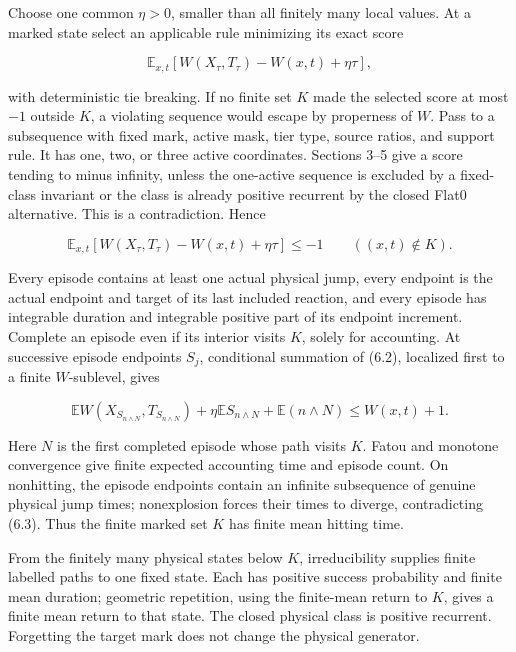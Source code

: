 Choose one common \(\eta>0\), smaller than all finitely many local
values. At a marked state select an applicable rule minimizing its exact
score

\[
       \mathbb E_{x,t}[W(X_\tau,T_\tau)-W(x,t)+\eta\tau], \tag{6.1}
\]

with deterministic tie breaking. If no finite set \(K\) made the
selected score at most \(-1\) outside \(K\), a violating sequence would
escape by properness of \(W\). Pass to a subsequence with fixed mark,
active mask, tier type, source ratios, and support rule. It has one,
two, or three active coordinates. Sections 3--5 give a score tending to
minus infinity, unless the one-active sequence is excluded by a
fixed-class invariant or the class is already positive recurrent by the
closed Flat0 alternative. This is a contradiction. Hence

\[
 \mathbb E_{x,t}[W(X_\tau,T_\tau)-W(x,t)+\eta\tau]\le-1
                 \qquad((x,t)\notin K).             \tag{6.2}
\]

Every episode contains at least one actual physical jump, every endpoint
is the actual endpoint and target of its last included reaction, and
every episode has integrable duration and integrable positive part of
its endpoint increment. Complete an episode even if its interior visits
\(K\), solely for accounting. At successive episode endpoints \(S_j\),
conditional summation of (6.2), localized first to a finite
\(W\)-sublevel, gives

\[
 \mathbb E W(X_{S_{n\wedge N}} ,T_{S_{n\wedge N}})
 +\eta\mathbb E S_{n\wedge N}+\mathbb E(n\wedge N)
 \le W(x,t)+1.                                      \tag{6.3}
\]

Here \(N\) is the first completed episode whose path visits \(K\). Fatou
and monotone convergence give finite expected accounting time and
episode count. On nonhitting, the episode endpoints contain an infinite
subsequence of genuine physical jump times; nonexplosion forces their
times to diverge, contradicting (6.3). Thus the finite marked set \(K\)
has finite mean hitting time.

From the finitely many physical states below \(K\), irreducibility
supplies finite labelled paths to one fixed state. Each has positive
success probability and finite mean duration; geometric repetition,
using the finite-mean return to \(K\), gives a finite mean return to
that state. The closed physical class is positive recurrent. Forgetting
the target mark does not change the physical generator.

